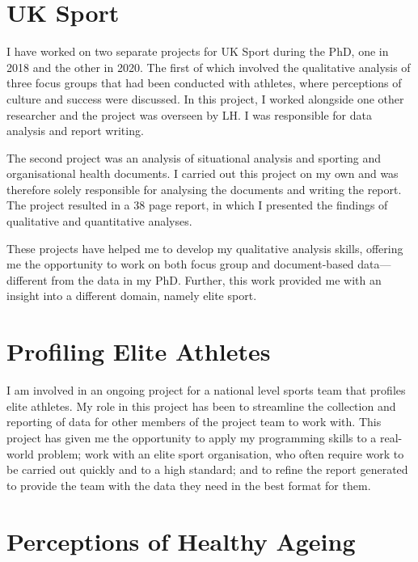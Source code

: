 \documentclass[
  12pt,
  a4paper,
]{book}
\begin{document}
\hypertarget{uk-sport}{%
\section{UK Sport}\label{uk-sport}}

I have worked on two separate projects for UK Sport during the PhD, one in 2018 and the other in 2020. The first of which involved the qualitative analysis of three focus groups that had been conducted with athletes, where perceptions of culture and success were discussed. In this project, I worked alongside one other researcher and the project was overseen by LH. I was responsible for data analysis and report writing.

The second project was an analysis of situational analysis and sporting and organisational health documents. I carried out this project on my own and was therefore solely responsible for analysing the documents and writing the report. The project resulted in a 38 page report, in which I presented the findings of qualitative and quantitative analyses.

These projects have helped me to develop my qualitative analysis skills, offering me the opportunity to work on both focus group and document-based data---different from the data in my PhD. Further, this work provided me with an insight into a different domain, namely elite sport.

\hypertarget{profiling-elite-athletes}{%
\section{Profiling Elite Athletes}\label{profiling-elite-athletes}}

I am involved in an ongoing project for a national level sports team that profiles elite athletes. My role in this project has been to streamline the collection and reporting of data for other members of the project team to work with. This project has given me the opportunity to apply my programming skills to a real-world problem; work with an elite sport organisation, who often require work to be carried out quickly and to a high standard; and to refine the report generated to provide the team with the data they need in the best format for them.

\hypertarget{perceptions-of-healthy-ageing}{%
\section{Perceptions of Healthy Ageing}\label{perceptions-of-healthy-ageing}}
\end{document}
